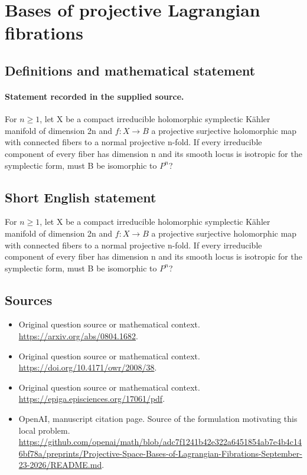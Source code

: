 \documentclass[11pt]{article}
\begin{document}
\section*{Bases of projective Lagrangian fibrations}\label{statement}
\subsection{Definitions and mathematical statement}
\paragraph{Statement recorded in the supplied source.}
For $n\geq 1$, let X be a compact irreducible holomorphic symplectic Kähler manifold of dimension 2n and $f:X\to B$ a projective surjective holomorphic map with connected fibers to a normal projective n-fold. If every irreducible component of every fiber has dimension n and its smooth locus is isotropic for the symplectic form, must B be isomorphic to $P^n$?
\subsection{Short English statement}
For $n\geq 1$, let X be a compact irreducible holomorphic symplectic Kähler manifold of dimension 2n and $f:X\to B$ a projective surjective holomorphic map with connected fibers to a normal projective n-fold. If every irreducible component of every fiber has dimension n and its smooth locus is isotropic for the symplectic form, must B be isomorphic to $P^n$?
\subsection{Sources}
\begin{itemize}
\item[S1] Original question source or mathematical context.
\url{https://arxiv.org/abs/0804.1682}.
\item[S2] Original question source or mathematical context.
\url{https://doi.org/10.4171/owr/2008/38}.
\item[S3] Original question source or mathematical context.
\url{https://epiga.episciences.org/17061/pdf}.
\item[S4] OpenAI, manuscript citation page. Source of the formulation motivating this local problem.
\url{https://github.com/openai/math/blob/adc7f1241b42e322a6451854ab7e4b4c146bf78a/preprints/Projective-Space-Bases-of-Lagrangian-Fibrations-September-23-2026/README.md}.
\end{itemize}
\end{document}
